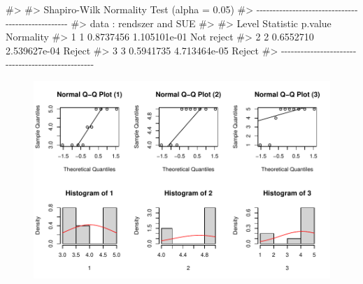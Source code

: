 \documentclass[
  letterpaper,
]{krantz}
\makeatletter
\newenvironment{Shaded}{\begin{snugshade}}{\end{snugshade}}
\newcommand{\CommentTok}[1]{\textcolor[rgb]{0.37,0.37,0.37}{#1}}
\newenvironment{kframe}{%
\medskip{}
\setlength{\fboxsep}{.8em}
 \def\at@end@of@kframe{}%
 \ifinner\ifhmode%
  \def\at@end@of@kframe{\end{minipage}}%
  \begin{minipage}{\columnwidth}%
 \fi\fi%
 \def\FrameCommand##1{\hskip\@totalleftmargin \hskip-\fboxsep
 \colorbox{shadecolor}{##1}\hskip-\fboxsep
     \hskip-\linewidth \hskip-\@totalleftmargin \hskip\columnwidth}%
 \MakeFramed {\advance\hsize-\width
   \@totalleftmargin\z@ \linewidth\hsize
   \@setminipage}}%
 {\par\unskip\endMakeFramed%
 \at@end@of@kframe}
\renewenvironment{Shaded}{\begin{kframe}}{\end{kframe}}
\makeatother
\begin{document}
\begin{Shaded}
\begin{Highlighting}[]
\CommentTok{\#\textgreater{} }
\CommentTok{\#\textgreater{}   Shapiro{-}Wilk Normality Test (alpha = 0.05) }
\CommentTok{\#\textgreater{} {-}{-}{-}{-}{-}{-}{-}{-}{-}{-}{-}{-}{-}{-}{-}{-}{-}{-}{-}{-}{-}{-}{-}{-}{-}{-}{-}{-}{-}{-}{-}{-}{-}{-}{-}{-}{-}{-}{-}{-}{-}{-}{-}{-}{-}{-}{-}{-}{-}{-} }
\CommentTok{\#\textgreater{}   data : rendszer and SUE }
\CommentTok{\#\textgreater{} }
\CommentTok{\#\textgreater{}   Level Statistic      p.value   Normality}
\CommentTok{\#\textgreater{} 1     1 0.8737456 1.105101e{-}01  Not reject}
\CommentTok{\#\textgreater{} 2     2 0.6552710 2.539627e{-}04      Reject}
\CommentTok{\#\textgreater{} 3     3 0.5941735 4.713464e{-}05      Reject}
\CommentTok{\#\textgreater{} {-}{-}{-}{-}{-}{-}{-}{-}{-}{-}{-}{-}{-}{-}{-}{-}{-}{-}{-}{-}{-}{-}{-}{-}{-}{-}{-}{-}{-}{-}{-}{-}{-}{-}{-}{-}{-}{-}{-}{-}{-}{-}{-}{-}{-}{-}{-}{-}{-}{-}}
\end{Highlighting}
\end{Shaded}

\begin{figure}[H]

{\centering \includegraphics{./sec_tobbvaltozos_variancia_files/figure-pdf/unnamed-chunk-17-1.pdf}

}

\end{figure}
\end{document}
